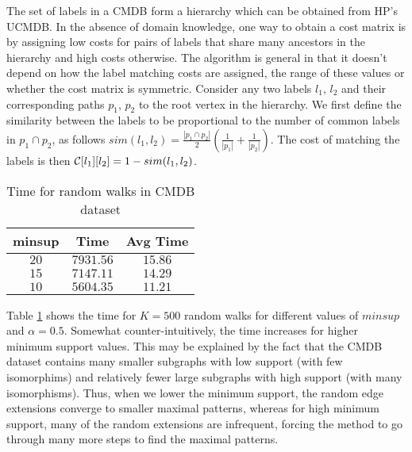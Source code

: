\smallskip{} The set of labels in a CMDB
form a hierarchy which can be obtained from HP's UCMDB. In the absence
of domain knowledge, one way to obtain a cost matrix is by assigning low
costs for pairs of labels that share many ancestors in the hierarchy and
high costs otherwise. The algorithm is general in that it doesn't depend
on how the label matching costs are assigned, the range of these values
or whether the cost matrix is symmetric.  Consider any two labels $l_1$,
$l_2$ and their corresponding paths $p_1$, $p_2$ to the root vertex in
the hierarchy.  We first define the similarity between the labels to be
proportional to the number of common labels in $p_1 \cap p_2$, as
follows
$sim(l_1,l_2) =  \frac{|p_1 \cap p_2|}{2}
  \left(\frac{1}{|p_1|} + \frac{1}{|p_2|}\right)$.
The cost of matching the labels is then 
$\mathcal{C}[l_1][l_2] = 1 - sim(l_1,l_2)$.

\begin{table}[!h]
\centering
\begin{tabular}{|c|c|c|}
        \hline
        minsup & Time & Avg Time \\
		\hline
        $20$ & $7931.56$ & $15.86$\\
        $15$ & $7147.11$ & $14.29$\\
        $10$ & $5604.35$ & $11.21$\\
		\hline
    \end{tabular}
    \caption{Time for random walks in CMDB dataset}
\label{tab:ge}
\end{table}


\smallskip{} Table \ref{tab:ge} shows the time
for $K=500$ random walks for different values of $minsup$ and $\alpha =
0.5$. Somewhat counter-intuitively, the time
increases for higher minimum support values.  This may be explained by
the fact that the CMDB dataset contains many smaller subgraphs with
low support (with few isomorphims) and relatively fewer large subgraphs 
with high support (with many isomorphisms).
Thus, when we lower the minimum support, the random edge extensions
converge to smaller maximal patterns, whereas for high minimum support,
many of the random extensions are infrequent, forcing the method to go
through many more steps to find the maximal patterns. 


